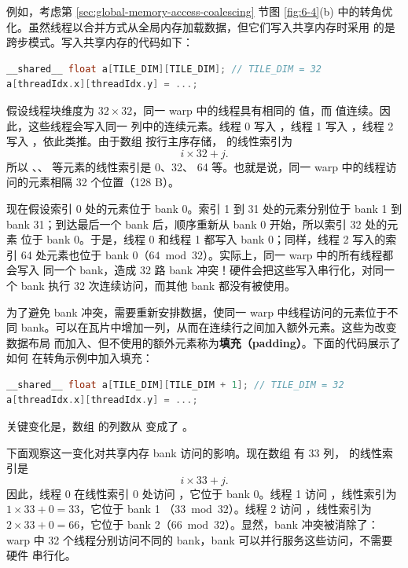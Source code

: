 例如，考虑第 \ref{sec:global-memory-access-coalescing} 节图 \ref{fig:6-4}(b)
中的转角优化。虽然线程以合并方式从全局内存加载数据，但它们写入共享内存时采用
的是跨步模式。写入共享内存的代码如下：

\begin{lstlisting}[language=C++]
__shared__ float a[TILE_DIM][TILE_DIM]; // TILE_DIM = 32
a[threadIdx.x][threadIdx.y] = ...;
\end{lstlisting}

假设线程块维度为 $32\times32$，同一 warp 中的线程具有相同的
 值，而  值连续。因此，这些线程会写入同一
列中的连续元素。线程 0 写入 ，线程 1 写入 ，线程 2
写入 ，依此类推。由于数组  按行主序存储，
的线性索引为
\[
  i\times32+j.
\]
所以 、、 等元素的线性索引是 0、32、
64 等。也就是说，同一 warp 中的线程访问的元素相隔 32 个位置（128 B）。

现在假设索引 0 处的元素位于 bank 0。索引 1 到 31 处的元素分别位于 bank 1 到
bank 31；到达最后一个 bank 后，顺序重新从 bank 0 开始，所以索引 32 处的元素
位于 bank 0。于是，线程 0 和线程 1 都写入 bank 0；同样，线程 2 写入的索引 64
处元素也位于 bank 0（$64\bmod32$）。实际上，同一 warp 中的所有线程都会写入
同一个 bank，造成 32 路 bank 冲突！硬件会把这些写入串行化，对同一个 bank 执行
32 次连续访问，而其他 bank 都没有被使用。

为了避免 bank 冲突，需要重新安排数据，使同一 warp 中线程访问的元素位于不同
bank。可以在瓦片中增加一列，从而在连续行之间加入额外元素。这些为改变数据布局
而加入、但不使用的额外元素称为\textbf{填充（padding）}。下面的代码展示了如何
在转角示例中加入填充：

\begin{lstlisting}[language=C++]
__shared__ float a[TILE_DIM][TILE_DIM + 1]; // TILE_DIM = 32
a[threadIdx.x][threadIdx.y] = ...;
\end{lstlisting}

关键变化是，数组  的列数从  变成了
。

下面观察这一变化对共享内存 bank 访问的影响。现在数组  有 33 列，
 的线性索引是
\[
  i\times33+j.
\]
因此，线程 0 在线性索引 0 处访问 ，它位于 bank 0。线程 1
访问 ，线性索引为 $1\times33+0=33$，它位于 bank 1
（$33\bmod32$）。线程 2 访问 ，线性索引为
$2\times33+0=66$，它位于 bank 2（$66\bmod32$）。显然，bank 冲突被消除了：
warp 中 32 个线程分别访问不同的 bank，bank 可以并行服务这些访问，不需要硬件
串行化。

